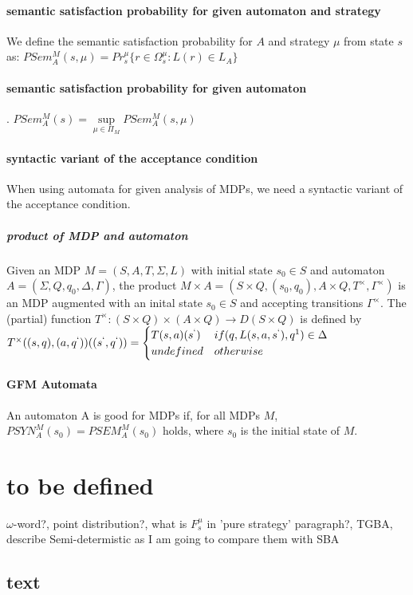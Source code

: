 \documentclass{fithesis3}
\begin{document}
		\paragraph{semantic satisfaction probability for given automaton and strategy}
		We define the semantic satisfaction probability for $A$
		and strategy $\mu$ from state $s$ as:\newline
		$PSem_A^M(s,\mu)=Pr_s^\mu\{r \in\Omega_s^\mu:L(r)\in L_A  \}$
		\paragraph{semantic satisfaction probability for given automaton}
		.\newline
		$PSem_A^M(s)=\underset{\mu \in \Pi_M}{\sup} PSem_A^M(s, \mu)$
		\paragraph{syntactic variant of the acceptance condition}
		When using automata for given analysis of MDPs, we need
		a syntactic variant of the acceptance condition.
		\subparagraph{product of MDP and automaton}
		Given an MDP $M=(S,A,T,\Sigma,L)$ with initial state $s_0 \in S$
		and automaton $A = (\Sigma, Q, q_0, \Delta, \Gamma)$,
		the product $M \times A = (
		S \times Q,
		(s_0, q_0),
		A \times Q,
		T^\times,
		\Gamma^\times
		)$ is an MDP augmented with an inital state $s_0 \in S$ 
		and accepting transitions $\Gamma^\times$.
		The (partial) function
		$T^\times:
		(S \times Q) \times (A \times Q) \rightarrow D(S \times Q)$
		is defined by
		$T^\times((s,q), (a,q^`))((s^`, q^`))=
		\begin{cases}
			T(s,a)(s^`) &if (q,L(s,a,s^`),q^1) \in \Delta\\
			undefined &otherwise
		\end{cases}
		$
		\paragraph{GFM Automata}
		An automaton A is good for MDPs if, for all MDPs $M$, $PSYN_A^M(s_0) = PSEM_A^M(s_0)$ holds, where $s_0$ is the initial state of $M$.
		\section{to be defined}
		$\omega$-word?, point distribution?, what is $F_s^\mu$ in 'pure strategy' paragraph?, TGBA, describe Semi-determistic as I am going to compare them with SBA 
		\subsection{text}
		 
\end{document}
